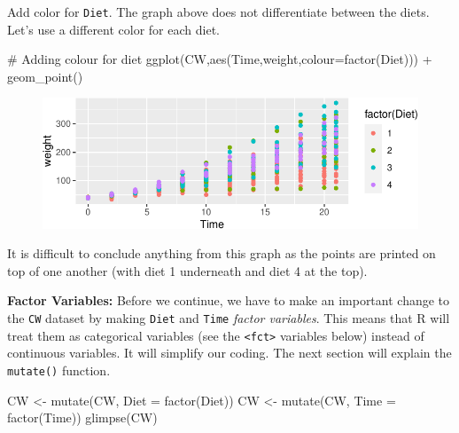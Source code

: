 \documentclass[
  letterpaper,
  DIV=11,
  numbers=noendperiod]{scrreprt}
\newenvironment{Shaded}{\begin{snugshade}}{\end{snugshade}}
\newcommand{\AttributeTok}[1]{\textcolor[rgb]{0.40,0.45,0.13}{#1}}
\newcommand{\CommentTok}[1]{\textcolor[rgb]{0.37,0.37,0.37}{#1}}
\newcommand{\FunctionTok}[1]{\textcolor[rgb]{0.28,0.35,0.67}{#1}}
\newcommand{\NormalTok}[1]{\textcolor[rgb]{0.00,0.23,0.31}{#1}}
\newcommand{\OtherTok}[1]{\textcolor[rgb]{0.00,0.23,0.31}{#1}}
\newcommand{\SpecialCharTok}[1]{\textcolor[rgb]{0.37,0.37,0.37}{#1}}
\theoremstyle{definition}
\theoremstyle{plain}
\theoremstyle{plain}
\theoremstyle{remark}
\begin{document}
Add color for \texttt{Diet}. The graph above does not differentiate
between the diets. Let's use a different color for each diet.

\begin{Shaded}
\begin{Highlighting}[]
\CommentTok{\# Adding colour for diet}
\FunctionTok{ggplot}\NormalTok{(CW,}\FunctionTok{aes}\NormalTok{(Time,weight,}\AttributeTok{colour=}\FunctionTok{factor}\NormalTok{(Diet))) }\SpecialCharTok{+}
  \FunctionTok{geom\_point}\NormalTok{() }
\end{Highlighting}
\end{Shaded}

\begin{figure}[H]

{\centering \includegraphics{./01-Introduction-to-R_files/figure-pdf/addColourPlot-1.pdf}

}

\end{figure}

It is difficult to conclude anything from this graph as the points are
printed on top of one another (with diet 1 underneath and diet 4 at the
top).

\textbf{Factor Variables:} Before we continue, we have to make an
important change to the \texttt{CW} dataset by making \texttt{Diet} and
\texttt{Time} \emph{factor variables}. This means that R will treat them
as categorical variables (see the \texttt{\textless{}fct\textgreater{}}
variables below) instead of continuous variables. It will simplify our
coding. The next section will explain the \texttt{mutate()} function.

\begin{Shaded}
\begin{Highlighting}[]
\NormalTok{CW }\OtherTok{\textless{}{-}} \FunctionTok{mutate}\NormalTok{(CW, }\AttributeTok{Diet =} \FunctionTok{factor}\NormalTok{(Diet))}
\NormalTok{CW }\OtherTok{\textless{}{-}} \FunctionTok{mutate}\NormalTok{(CW, }\AttributeTok{Time =} \FunctionTok{factor}\NormalTok{(Time))}
\FunctionTok{glimpse}\NormalTok{(CW)}
\end{Highlighting}
\end{Shaded}
\end{document}

